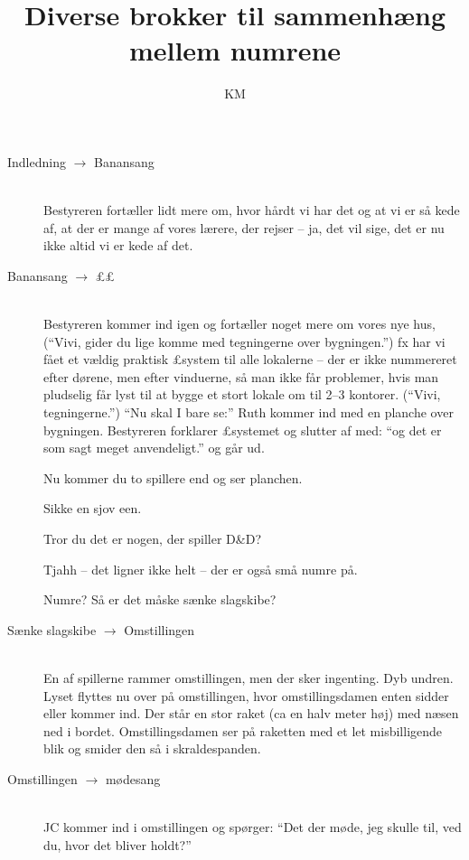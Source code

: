 \documentclass[a4paper,11pt]{article}
\title{Diverse brokker til sammenhæng mellem numrene}
\author{KM}
\begin{document}
\maketitle

\begin{description}
\item[Indledning $\rightarrow$ Banansang]\hfill\\
Bestyreren fortæller lidt mere om, hvor hårdt vi har det og at vi er så kede af,
at der er mange af vores lærere, der rejser -- ja, det vil sige, det er nu ikke
altid vi er kede af det.

\item[Banansang $\rightarrow$ ££]\hfill\\
Bestyreren kommer ind igen og fortæller noget mere om vores nye hus, (``Vivi,
gider du lige komme med tegningerne over bygningen.'') fx har vi fået et vældig
praktisk £system til alle lokalerne -- der er ikke nummereret efter dørene, men
efter vinduerne, så man ikke får problemer, hvis man pludselig får lyst til at
bygge et stort lokale om til 2--3 kontorer. (``Vivi, tegningerne.'') ``Nu skal I
bare se:'' Ruth kommer ind med en planche over bygningen. Bestyreren forklarer
£systemet og slutter af med: ``og det er som sagt meget anvendeligt.'' og går
ud.

Nu kommer du to spillere end og ser planchen.

\begin{sketch}
 Sikke en sjov een.

 Tror du det er nogen, der spiller D\&D?

 Tjahh -- det ligner ikke helt -- der er også små numre på.

 Numre? Så er det måske sænke slagskibe?
\end{sketch}

\item[Sænke slagskibe $\rightarrow$ Omstillingen]\hfill\\
En af spillerne rammer omstillingen, men der sker ingenting. Dyb undren. Lyset
flyttes nu over på omstillingen, hvor omstillingsdamen enten sidder eller kommer
ind. Der står en stor raket (ca en halv meter høj) med næsen ned i
bordet. Omstillingsdamen ser på raketten med et let misbilligende blik og smider
den så i skraldespanden.

\item[Omstillingen $\rightarrow$ mødesang]\hfill\\
JC kommer ind i omstillingen og spørger: ``Det der møde, jeg skulle til, ved du,
hvor det bliver holdt?''


\end{description}
\end{document}
